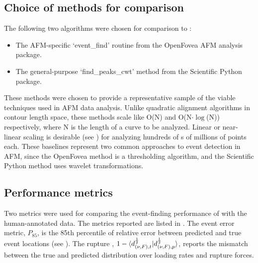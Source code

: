 \subsection{Choice of methods for comparison}

The following two algorithms were chosen for comparison to \name{}: 

\begin{itemize}
\item The AFM-specific `event\_find' routine from the OpenFovea AFM analysis package.
\item The general-purpose `find\_peaks\_cwt' method from the Scientific Python package.
\end{itemize}

 These methods were chosen to provide a representative sample of the viable techniques used in AFM data analysis. Unlike quadratic alignment algorithms in contour length space, these methods scale like O(N) and O(N$\cdot\log$(N)) respectively, where N is the length of a curve to be analyzed. Linear or near-linear scaling is desirable (see ) for analyzing hundreds of \fec{}s of millions of points each. These baselines represent two common approaches to event detection in AFM, since the OpenFovea method is a thresholding algorithm, and the Scientific Python method uses wavelet transformations. 

\subsection{Performance metrics}

Two metrics were used for comparing the event-finding performance of \name{} with the human-annotated data. The metrics reported are listed in . The event error metric, $P_{85}$, is the 85th percentile of relative error between predicted and true event locations (see ). The rupture \BccLong{}, $1-\braket{d_{(\nu,F),t}^{\frac{1}{2}}|d_{(\nu,F),p}^{\frac{1}{2}}}$, reports the mismatch between the true and predicted distribution over loading rates and rupture forces. 


